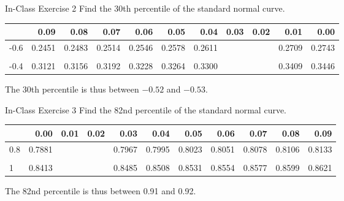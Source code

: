 \documentclass[
  ignorenonframetext,
]{beamer}
\begin{document}
\begin{frame}{In-Class Exercise 2}
\protect\hypertarget{in-class-exercise-2}{}
Find the 30th percentile of the standard normal curve.\pause

\scriptsize
\tabcolsep=3pt

\begin{tabular}[t]{l|r|r|r|r|r|r|>{}r|>{}r|r|r}
\hline
  & 0.09 & 0.08 & 0.07 & 0.06 & 0.05 & 0.04 & 0.03 & 0.02 & 0.01 & 0.00\\
\hline
-0.6 & 0.2451 & 0.2483 & 0.2514 & 0.2546 & 0.2578 & 0.2611 & \cellcolor{lightgray}{0.2643} & \cellcolor{lightgray}{0.2676} & 0.2709 & 0.2743\\
\hline
\cellcolor{lightgray}{-0.5} & \cellcolor{lightgray}{0.2776} & \cellcolor{lightgray}{0.2810} & \cellcolor{lightgray}{0.2843} & \cellcolor{lightgray}{0.2877} & \cellcolor{lightgray}{0.2912} & \cellcolor{lightgray}{0.2946} & \cellcolor{lightgray}{0.2981} & \cellcolor{lightgray}{0.3015} & \cellcolor{lightgray}{0.3050} & \cellcolor{lightgray}{0.3085}\\
\hline
-0.4 & 0.3121 & 0.3156 & 0.3192 & 0.3228 & 0.3264 & 0.3300 & \cellcolor{lightgray}{0.3336} & \cellcolor{lightgray}{0.3372} & 0.3409 & 0.3446\\
\hline
\end{tabular}

\normalsize

The 30th percentile is thus between \(-0.52\) and \(-0.53\).
\end{frame}

\begin{frame}{In-Class Exercise 3}
\protect\hypertarget{in-class-exercise-3}{}
Find the 82nd percentile of the standard normal curve.\pause

\scriptsize
\tabcolsep=3pt

\begin{tabular}[t]{l|r|>{}r|>{}r|r|r|r|r|r|r|r}
\hline
  & 0.00 & 0.01 & 0.02 & 0.03 & 0.04 & 0.05 & 0.06 & 0.07 & 0.08 & 0.09\\
\hline
0.8 & 0.7881 & \cellcolor{lightgray}{0.7910} & \cellcolor{lightgray}{0.7939} & 0.7967 & 0.7995 & 0.8023 & 0.8051 & 0.8078 & 0.8106 & 0.8133\\
\hline
\cellcolor{lightgray}{0.9} & \cellcolor{lightgray}{0.8159} & \cellcolor{lightgray}{0.8186} & \cellcolor{lightgray}{0.8212} & \cellcolor{lightgray}{0.8238} & \cellcolor{lightgray}{0.8264} & \cellcolor{lightgray}{0.8289} & \cellcolor{lightgray}{0.8315} & \cellcolor{lightgray}{0.8340} & \cellcolor{lightgray}{0.8365} & \cellcolor{lightgray}{0.8389}\\
\hline
1 & 0.8413 & \cellcolor{lightgray}{0.8438} & \cellcolor{lightgray}{0.8461} & 0.8485 & 0.8508 & 0.8531 & 0.8554 & 0.8577 & 0.8599 & 0.8621\\
\hline
\end{tabular}

\normalsize

The 82nd percentile is thus between 0.91 and 0.92.
\end{frame}
\end{document}
